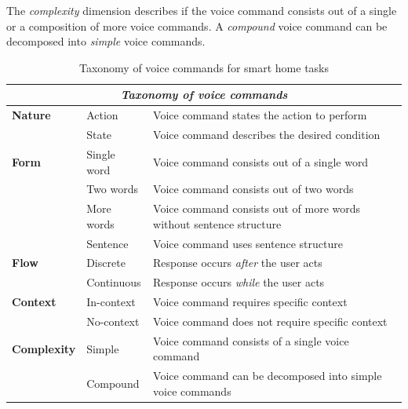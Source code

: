 \documentclass[sigchi]{acmart}
\begin{document}
	The \textit{complexity} dimension describes if the voice command consists out of a single or a composition of more voice commands. A \textit{compound} voice command can be decomposed into \textit{simple} voice commands.
	\begin{table}[t]
		\begin{center}
			\caption{Taxonomy of voice commands for smart home tasks}
			\label{tab:taxVoice}
			\begin{footnotesize}
				\begin{tabular}{p{0.2\columnwidth} p{} p{}} \toprule
					\multicolumn{3}{c}{\textit{Taxonomy of voice commands}} \\ \midrule
					\textbf{Nature}		& Action		& Voice command states the action to perform \\
										& State			& Voice command describes the desired condition \\ \midrule
					\textbf{Form} 		& Single word	& Voice command consists out of a single word \\
										& Two words		& Voice command consists out of two words \\
										& More words	& Voice command consists out of more words without sentence structure \\
										& Sentence		& Voice command uses sentence structure \\ \midrule
					\textbf{Flow}		& Discrete		& Response occurs \textit{after} the user acts \\ 
										& Continuous 	& Response occurs \textit{while} the user acts  \\ \midrule
					\textbf{Context}	& In-context	& Voice command requires specific context \\
										& No-context	& Voice command does not require specific context \\ \midrule
					\textbf{Complexity}	& Simple		& Voice command consists of a single voice command \\
										& Compound		& Voice command can be decomposed into simple voice commands  \\ \bottomrule
				\end{tabular}
			\end{footnotesize}
		\end{center}
	\end{table}
\end{document}
